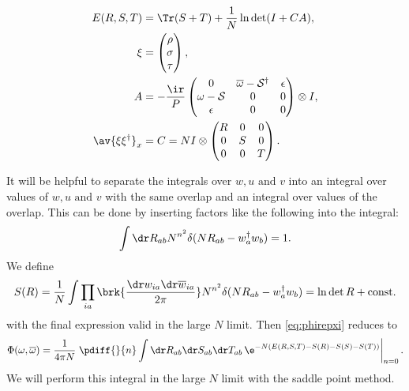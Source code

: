 \documentclass[12pt]{article}
\newcommand{\dg}{^\dagger}
\newcommand{\shift}{\mathcal{S}}
\newcommand{\omb}{\overline{\omega}}
\newcommand{\dw}{\dr w}
\newcommand{\dwb}{\dr\overline{w}}
\begin{document}
\begin{equation}\label{eq:overlapenergy}
\begin{aligned}
  E(R,S,T) &= \Tr(S+T) + \frac{1}{N} \ln \det (I+CA),\\
  \xi &= \begin{pmatrix}
           \rho \\
           \sigma \\
           \tau \\
         \end{pmatrix},
 \\
  A &= -\frac{\ir}{P}
       \begin{pmatrix}
         0        & \omb-\shift\dg & \epsilon \\
         \omega-\shift & 0            & 0 \\
         \epsilon & 0            & 0 \\
       \end{pmatrix}\otimes I,\\
  \av{\xi\xi\dg}_x &=  C = N I\otimes
       \begin{pmatrix}
         R & 0 & 0 \\
         0 & S & 0 \\
         0 & 0 & T \\
       \end{pmatrix}.  \end{aligned}
\end{equation}
%

It will be helpful to separate the integrals over $w,u\text{ and }v$ into an integral over values of $w,u\text{ and }v$ with the same overlap and an integral over values of the overlap.
This can be done by inserting factors like the following into the integral:
%
\begin{equation}\label{eq:overlapdelta}
  \int \dr R_{ab} N^{n^2} \delta (N R_{ab} - w_a\dg w_b ) = 1.
\end{equation}
%
We define
%
\begin{equation}\label{eq:overlapentropy}
  S(R) = \frac{1}{N} \int \prod_{ia}\brk{ \frac{\dw_{ia}\dwb_{ia}}{2\pi} }
  N^{n^2} \delta (N R_{ab} - w_a\dg w_b )
   = \ln\det R + \text{const.}
\end{equation}
%
with the final expression valid in the large $N$ limit.
Then \eqref{eq:phirepxi} reduces to
%
\begin{equation}\label{eq:phioverlap}
  \Phi(\omega,\omb) = \frac{1}{4\pi N}  \left.\pdiff{}{n}
       \int \dr R_{ab} \dr S_{ab} \dr T_{ab}
       \,\e^{-N(E(R,S,T)-S(R)-S(S)-S(T))}
       \right\rvert_{n=0}.
\end{equation}
%
We will perform this integral in the large $N$ limit with the saddle point method.
\end{document}

